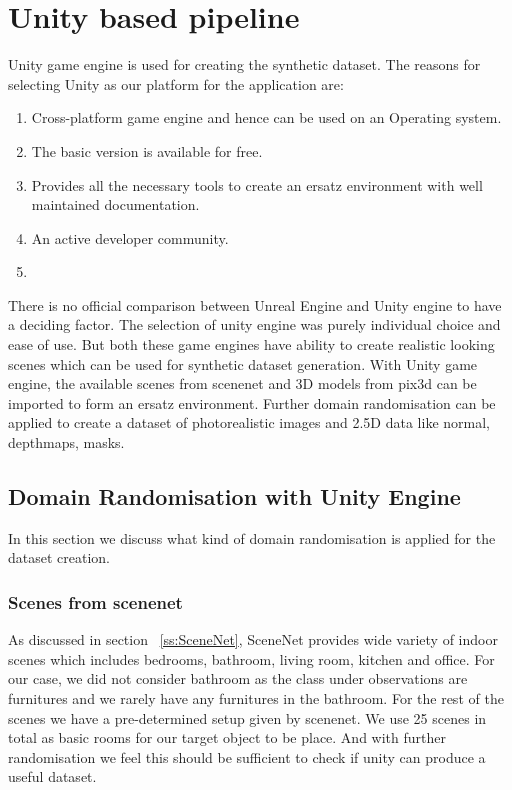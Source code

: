 \section{Unity based pipeline}\label{ss:Unity Pipeline}
Unity game engine is used for creating the synthetic dataset.
The reasons for selecting Unity as our platform for the application are:
\begin{enumerate}
    \item Cross-platform game engine and hence can be used on an Operating system.
    \item The basic version is available for free.
    \item Provides all the necessary tools to create an ersatz environment with well maintained documentation.
    \item An active developer community.
\item \end{enumerate}

There is no official comparison between Unreal Engine and Unity engine to have a deciding factor.
The selection of unity engine was purely individual choice and ease of use.
But both these game engines have ability to create realistic looking scenes which can be used for synthetic dataset generation.
With Unity game engine, the available scenes from scenenet and 3D models from pix3d can be imported to form an ersatz environment.
Further domain randomisation can be applied to create a dataset of photorealistic images and 2.5D data like normal, depthmaps, masks.

\subsection{Domain Randomisation with Unity Engine}\label{ss:Domain Randomisation with unity engine}
In this section we discuss what kind of domain randomisation is applied for the dataset creation.
\subsubsection{Scenes from scenenet}
As discussed in section ~\ref{ss:SceneNet}, SceneNet provides wide variety of indoor scenes which includes bedrooms, bathroom, living room, kitchen and office.
For our case, we did not consider bathroom as the class under observations are furnitures and we rarely have any furnitures in the bathroom.
For the rest of the scenes we have a pre-determined setup given by scenenet. We use 25 scenes in total as basic rooms for our target object to be place.
And with further randomisation we feel this should be sufficient to check if unity can produce a useful dataset.

